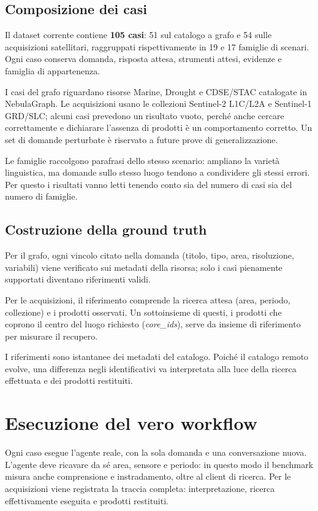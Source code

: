 \subsection{Composizione dei casi}

Il dataset corrente contiene \textbf{105 casi}: 51 sul catalogo a grafo e 54
sulle acquisizioni satellitari, raggruppati rispettivamente in 19 e 17
famiglie di scenari. Ogni caso conserva domanda, risposta attesa, strumenti
attesi, evidenze e famiglia di appartenenza.

I casi del grafo riguardano risorse Marine, Drought e CDSE/STAC catalogate in
NebulaGraph. Le acquisizioni usano le collezioni Sentinel-2 L1C/L2A e
Sentinel-1 GRD/SLC; alcuni casi prevedono un risultato vuoto, perché anche
cercare correttamente e dichiarare l'assenza di prodotti è un comportamento
corretto. Un set di domande perturbate è riservato a future prove di
generalizzazione.

Le famiglie raccolgono parafrasi dello stesso scenario: ampliano la varietà
linguistica, ma domande sullo stesso luogo tendono a condividere gli stessi
errori. Per questo i risultati vanno letti tenendo conto sia del numero di casi
sia del numero di famiglie.

\subsection{Costruzione della ground truth}

Per il grafo, ogni vincolo citato nella domanda (titolo, tipo, area,
risoluzione, variabili) viene verificato sui metadati della risorsa; solo i
casi pienamente supportati diventano riferimenti validi.

Per le acquisizioni, il riferimento comprende la ricerca attesa (area, periodo,
collezione) e i prodotti osservati. Un sottoinsieme di questi, i prodotti che
coprono il centro del luogo richiesto (\emph{core\_ids}), serve da insieme di
riferimento per misurare il recupero.

I riferimenti sono istantanee dei metadati del catalogo. Poiché il catalogo
remoto evolve, una differenza negli identificativi va interpretata alla luce
della ricerca effettuata e dei prodotti restituiti.

\section{Esecuzione del vero workflow}

Ogni caso esegue l'agente reale, con la sola domanda e una conversazione nuova.
L'agente deve ricavare da sé area, sensore e periodo: in questo modo il
benchmark misura anche comprensione e instradamento, oltre al client di
ricerca. Per le acquisizioni viene registrata la traccia completa:
interpretazione, ricerca effettivamente eseguita e prodotti restituiti.

